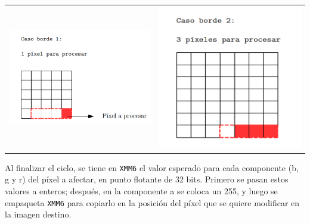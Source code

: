         {\centering \begin{tabular}{cc}
          \includegraphics[width=7cm]{./imagenes/7.png} &
          \includegraphics[width=7cm]{./imagenes/8.png}
          \\
        \end{tabular}}

        Al finalizar el ciclo, se tiene en \texttt{XMM6} el valor esperado para cada componente (\textsf{b}, \textsf{g} y \textsf{r}) del píxel a afectar, en punto flotante de 32 bits. Primero se pasan estos valores a enteros; después, en la componente \textsf{a} se coloca un 255, y luego se empaqueta \texttt{XMM6} para copiarlo en la posición del píxel que se quiere modificar en la imagen destino.
